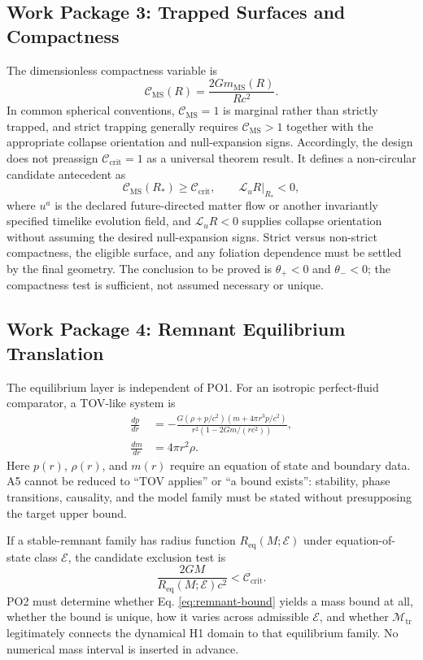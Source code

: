 \documentclass[conference]{IEEEtran}
\newcommand{\Ccrit}{\mathcal{C}_{\mathrm{crit}}}
\newcommand{\Cms}{\mathcal{C}_{\mathrm{MS}}}
\begin{document}
\subsection{Work Package 3: Trapped Surfaces and Compactness}
The dimensionless compactness variable is
\begin{equation}
\Cms(R)=\frac{2Gm_{\mathrm{MS}}(R)}{Rc^2}.
\label{eq:compactness}
\end{equation}
In common spherical conventions, $\Cms=1$ is marginal rather than strictly trapped, and strict trapping generally requires $\Cms>1$ together with the appropriate collapse orientation and null-expansion signs. Accordingly, the design does not preassign $\Ccrit=1$ as a universal theorem result. It defines a non-circular candidate antecedent as
\begin{equation}
\Cms(R_*)\geq \Ccrit,
\qquad
\left.\mathcal{L}_{u}R\right|_{R_*}<0,
\label{eq:trapping-criterion}
\end{equation}
where $u^a$ is the declared future-directed matter flow or another invariantly specified timelike evolution field, and $\mathcal{L}_{u}R<0$ supplies collapse orientation without assuming the desired null-expansion signs. Strict versus non-strict compactness, the eligible surface, and any foliation dependence must be settled by the final geometry. The conclusion to be proved is $\theta_{+}<0$ and $\theta_{-}<0$; the compactness test is sufficient, not assumed necessary or unique.

\subsection{Work Package 4: Remnant Equilibrium Translation}
The equilibrium layer is independent of PO1. For an isotropic perfect-fluid comparator, a TOV-like system is
\begin{align}
\frac{dp}{dr}
&=-\frac{G\left(\rho+p/c^2\right)
\left(m+4\pi r^3p/c^2\right)}
{r^2\left(1-2Gm/(rc^2)\right)}, \nonumber\\
\frac{dm}{dr}&=4\pi r^2\rho.
\label{eq:tov}
\end{align}
Here $p(r)$, $\rho(r)$, and $m(r)$ require an equation of state and boundary data. A5 cannot be reduced to ``TOV applies'' or ``a bound exists'': stability, phase transitions, causality, and the model family must be stated without presupposing the target upper bound.

If a stable-remnant family has radius function $R_{\mathrm{eq}}(M;\mathcal{E})$ under equation-of-state class $\mathcal{E}$, the candidate exclusion test is
\begin{equation}
\frac{2GM}{R_{\mathrm{eq}}(M;\mathcal{E})c^2}
<\Ccrit.
\label{eq:remnant-bound}
\end{equation}
PO2 must determine whether Eq. \eqref{eq:remnant-bound} yields a mass bound at all, whether the bound is unique, how it varies across admissible $\mathcal{E}$, and whether $\mathcal{M}_{\mathrm{tr}}$ legitimately connects the dynamical H1 domain to that equilibrium family. No numerical mass interval is inserted in advance.
\end{document}
